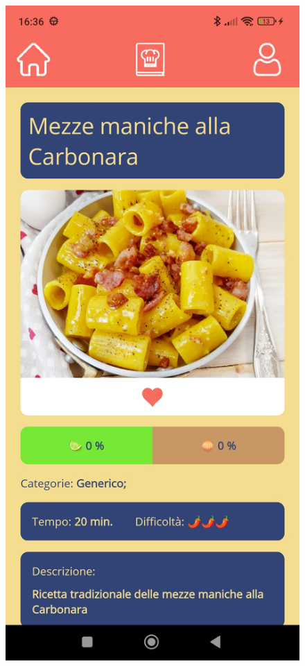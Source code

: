﻿\documentclass[a4paper,12pt]{report}
\begin{document}
\begin{figure}[h!]
    \begin{minipage}{.5\textwidth}
        \centering
        \includegraphics[width=0.9\linewidth]{app_images/Liked.jpg}
    \end{minipage}

\end{figure}
\end{document}
